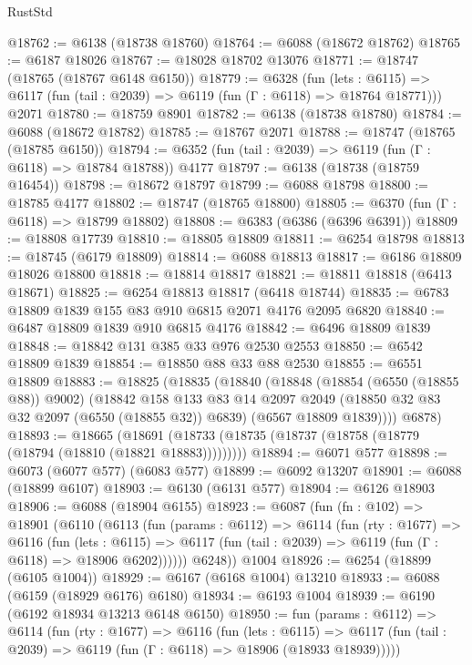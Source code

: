 \begin{lexlean}{RustStd}
\begin{coremodule}
@18762 := @6138 (@18738 @18760)
@18764 := @6088 (@18672 @18762)
@18765 := @6187 @18026
@18767 := @18028 @18702 @13076
@18771 := @18747 (@18765 (@18767 @6148 @6150))
@18779 := @6328
    (fun (lets : @6115) => @6117 (fun (tail : @2039) => @6119 (fun (Γ : @6118) => @18764 @18771)))
    @2071
@18780 := @18759 @8901
@18782 := @6138 (@18738 @18780)
@18784 := @6088 (@18672 @18782)
@18785 := @18767 @2071
@18788 := @18747 (@18765 (@18785 @6150))
@18794 := @6352 (fun (tail : @2039) => @6119 (fun (Γ : @6118) => @18784 @18788)) @4177
@18797 := @6138 (@18738 (@18759 @16454))
@18798 := @18672 @18797
@18799 := @6088 @18798
@18800 := @18785 @4177
@18802 := @18747 (@18765 @18800)
@18805 := @6370 (fun (Γ : @6118) => @18799 @18802)
@18808 := @6383 (@6386 (@6396 @6391))
@18809 := @18808 @17739
@18810 := @18805 @18809
@18811 := @6254 @18798
@18813 := @18745 (@6179 @18809)
@18814 := @6088 @18813
@18817 := @6186 @18809 @18026 @18800
@18818 := @18814 @18817
@18821 := @18811 @18818 (@6413 @18671)
@18825 := @6254 @18813 @18817 (@6418 @18744)
@18835 := @6783 @18809 @1839 @155 @83 @910 @6815 @2071 @4176 @2095 @6820
@18840 := @6487 @18809 @1839 @910 @6815 @4176
@18842 := @6496 @18809 @1839
@18848 := @18842 @131 @385 @33 @976 @2530 @2553
@18850 := @6542 @18809 @1839
@18854 := @18850 @88 @33 @88 @2530
@18855 := @6551 @18809
@18883 := @18825
    (@18835
      (@18840
        (@18848
          (@18854 (@6550 (@18855 @88)) @9002)
          (@18842
            @158
            @133
            @83
            @14
            @2097
            @2049
            (@18850 @32 @83 @32 @2097 (@6550 (@18855 @32)) @6839)
            (@6567 @18809 @1839))))
      @6878)
@18893 := @18665
    (@18691 (@18733 (@18735 (@18737 (@18758 (@18779 (@18794 (@18810 (@18821 @18883)))))))))
@18894 := @6071 @577
@18898 := @6073 (@6077 @577) (@6083 @577)
@18899 := @6092 @13207
@18901 := @6088 (@18899 @6107)
@18903 := @6130 (@6131 @577)
@18904 := @6126 @18903
@18906 := @6088 (@18904 @6155)
@18923 := @6087
    (fun (fn : @102) =>
    @18901
      (@6110
        (@6113
          (fun (params : @6112) =>
          @6114
            (fun (rty : @1677) =>
            @6116
              (fun (lets : @6115) =>
              @6117 (fun (tail : @2039) => @6119 (fun (Γ : @6118) => @18906 @6202))))))
        @6248))
    @1004
@18926 := @6254 (@18899 (@6105 @1004))
@18929 := @6167 (@6168 @1004) @13210
@18933 := @6088 (@6159 (@18929 @6176) @6180)
@18934 := @6193 @1004
@18939 := @6190 (@6192 @18934 @13213 @6148 @6150)
@18950 := fun (params : @6112) =>
  @6114
    (fun (rty : @1677) =>
    @6116
      (fun (lets : @6115) =>
      @6117 (fun (tail : @2039) => @6119 (fun (Γ : @6118) => @18906 (@18933 @18939)))))

\end{coremodule}
\end{lexlean}
